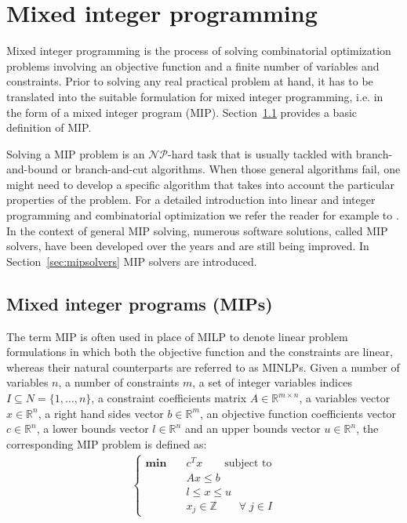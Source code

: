 \documentclass[a4paper,12pt,twoside]{scrbook}
\begin{document}
\chapter{Mixed integer programming} \label{ch:mips}
Mixed integer programming is the process of solving combinatorial optimization problems involving an objective function and a finite number of variables and constraints. Prior to solving any real practical problem at hand, it has to be translated into the suitable formulation for mixed integer programming, i.e. in the form of a mixed integer program (MIP). Section~\ref{sec:mip} provides a basic definition of MIP. \par 
Solving a MIP problem is an $\mathcal{NP}$-hard task that is usually tackled with branch-and-bound or branch-and-cut algorithms.
When those general algorithms fail, one might need to develop a specific algorithm that takes into account the particular properties of the problem.
For a detailed introduction into linear and integer programming and combinatorial optimization we refer the reader for example to \cite{fischetti2019}.
In the context of general MIP solving, numerous software solutions, called MIP solvers, have been developed over the years and are still being improved. In Section~\ref{sec:mipsolvers} MIP solvers are introduced.

\section{Mixed integer programs (MIPs)} \label{sec:mip}
The term MIP is often used in place of MILP to denote linear problem formulations in which both the objective function and the constraints are linear, whereas their natural counterparts are referred to as MINLPs.
Given a number of variables $n$, a number of constraints $m$, a set of integer variables indices $I \subseteq N = \{1, \dots, n\}$, a constraint coefficients matrix $A \in \mathbb{R}^{m \times n}$, a variables vector $x \in \mathbb{R}^n$, a right hand sides vector $b \in \mathbb{R}^m$, an objective function coefficients vector $c \in \mathbb{R}^n$, a lower bounds vector $l \in \mathbb{R}^n$ and an upper bounds vector $u \in \mathbb{R}^n$, the corresponding MIP problem is defined as:
\begin{align} \label{eq:mip}
	\begin{cases}
	\textbf{min} \quad & c^Tx \qquad \mbox{subject to} \\
				 & Ax \leq b \\
				 & l \leq x \leq u \\
				 & x_j \in \mathbb{Z} \qquad \forall \; j \in I
	\end{cases}
\end{align}
\end{document}

